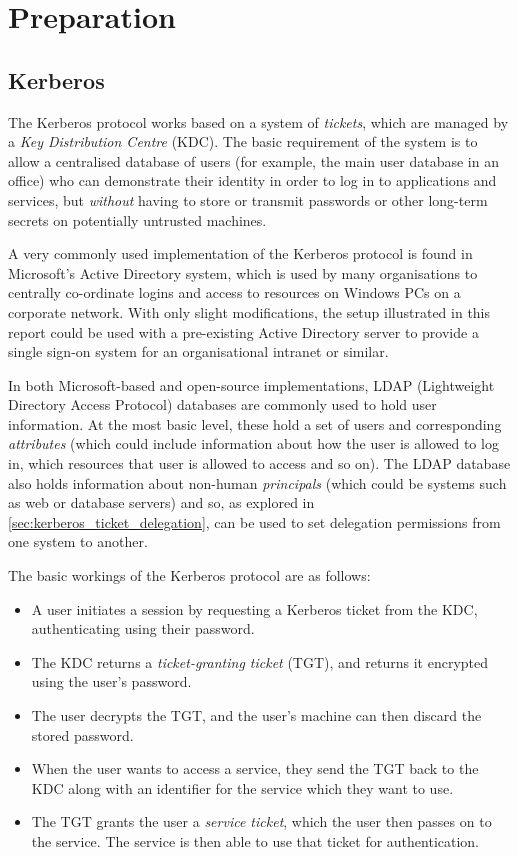 \documentclass[12pt]{report}
\begin{document}
\chapter{Preparation}

\section{Kerberos}
The Kerberos protocol works based on a system of \textit{tickets}, which are managed by a \textit{Key Distribution Centre} (KDC). The basic requirement of the system is to allow a centralised database of users (for example, the main user database in an office) who can demonstrate their identity in order to log in to applications and services, but \textit{without} having to store or transmit passwords or other long-term secrets on potentially untrusted machines.

A very commonly used implementation of the Kerberos protocol is found in Microsoft's Active Directory system, which is used by many organisations to centrally co-ordinate logins and access to resources on Windows PCs on a corporate network. With only slight modifications, the setup illustrated in this report could be used with a pre-existing Active Directory server to provide a single sign-on system for an organisational intranet or similar.

In both Microsoft-based and open-source implementations, LDAP (Lightweight Directory Access Protocol) databases are commonly used to hold user information. At the most basic level, these hold a set of users and corresponding \textit{attributes} (which could include information about how the user is allowed to log in, which resources that user is allowed to access and so on). The LDAP database also holds information about non-human \textit{principals} (which could be systems such as web or database servers) and so, as explored in \autoref{sec:kerberos_ticket_delegation}, can be used to set delegation permissions from one system to another.

The basic workings of the Kerberos protocol are as follows:

\begin{itemize}
\item
  A user initiates a session by requesting a Kerberos ticket from the KDC, authenticating using their password.
\item
  The KDC returns a \textit{ticket-granting ticket} (TGT), and returns it encrypted using the user's password.
\item
  The user decrypts the TGT, and the user's machine can then discard the stored password.
\item
  When the user wants to access a service, they send the TGT back to the KDC along with an identifier for the service which they want to use.
\item
  The TGT grants the user a \textit{service ticket}, which the user then passes on to the service. The service is then able to use that ticket for authentication.
\end{itemize}
\end{document}
